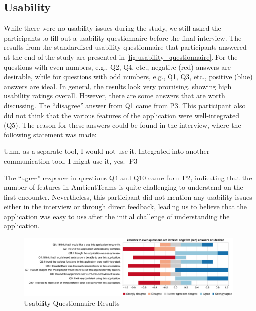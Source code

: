 \subsection{Usability}
\label{section:usability}
While there were no usability issues during the study, we still asked the participants to fill out a usability questionnaire before the final interview. The results from the standardized usability questionnaire that participants answered at the end of the study are presented in \autoref{fig:usability_questionnaire}. For the questions with even numbers, e.g., Q2, Q4, etc., negative (red) answers are desirable, while for questions with odd numbers, e.g., Q1, Q3, etc., positive (blue) answers are ideal. In general, the results look very promising, showing high usability ratings overall. However, there are some answers that are worth discussing. The \enquote{disagree} answer from Q1 came from P3. This participant also did not think that the various features of the application were well-integrated (Q5). The reason for these answers could be found in the interview, where the following statement was made:

\begin{displayquote}
    Uhm, as a separate tool, I would not use it. Integrated into another communication tool, I might use it, yes. -P3
\end{displayquote}

The \enquote{agree} response in questions Q4 and Q10 came from P2, indicating that the number of features in AmbientTeams is quite challenging to understand on the first encounter. Nevertheless, this participant did not mention any usability issues either in the interview or through direct feedback, leading us to believe that the application was easy to use after the initial challenge of understanding the application.

\begin{figure}[h]
    \centering
    \includegraphics[width=\linewidth]{plots/usability_likert.pdf}
    \caption{Usability Questionnaire Results}
    \label{fig:usability_questionnaire}
\end{figure}


